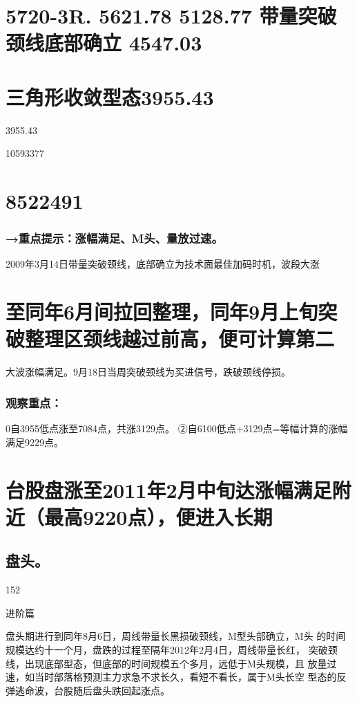 \documentclass{article}
\begin{document}
\section{5720-3R. 5621.78 5128.77 带量突破颈线底部确立 4547.03}

\section{三角形收敛型态3955.43}

3955.43

10593377

\section{8522491}

\subsubsection{→重点提示：涨幅满足、M头、量放过速。}

2009年3月14日带量突破颈线，底部确立为技术面最佳加码时机，波段大涨

\section{至同年6月间拉回整理，同年9月上旬突破整理区颈线越过前高，便可计算第二}

大波涨幅满足。9月18日当周突破颈线为买进信号，跌破颈线停损。

\subsubsection{观察重点：}

0自3955低点涨至7084点，共涨3129点。 ②自6100低点+3129点=等幅计算的涨幅满足9229点。

\section{台股盘涨至2011年2月中旬达涨幅满足附近（最高9220点），便进入长期}

\subsection{盘头。}

152

\clearpage

进阶篇

盘头期进行到同年8月6日，周线带量长黑损破颈线，M型头部确立，M头 的时间规模达约十一个月，盘跌的过程至隔年2012年2月4日，周线带量长红， 突破颈线，出现底部型态，但底部的时间规模五个多月，远低于M头规模，且 放量过速，如当时部落格预测主力求急不求长久，看短不看长，属于M头长空 型态的反弹逃命波，台股随后盘头跌回起涨点。
\end{document}
